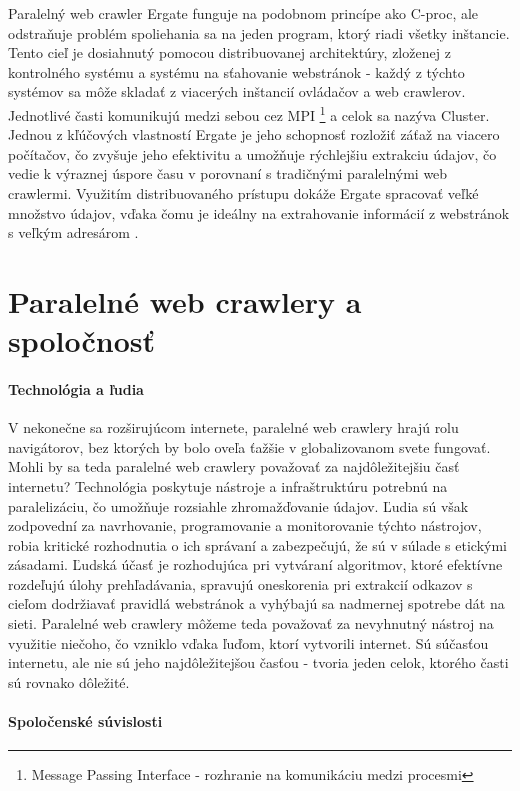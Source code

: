 \documentclass[10pt,twoside,slovak,a4paper]{article}
\begin{document}
Paralelný web crawler Ergate funguje na podobnom princípe ako C-proc, ale odstraňuje problém spoliehania sa na jeden program, ktorý riadi všetky inštancie. Tento cieľ je dosiahnutý pomocou distribuovanej architektúry, zloženej z kontrolného systému a systému na sťahovanie webstránok - každý z týchto systémov sa môže skladať z viacerých inštancií ovládačov a web crawlerov. Jednotlivé časti komunikujú medzi sebou cez MPI \footnote{Message Passing Interface - rozhranie na komunikáciu medzi procesmi} a celok sa nazýva Cluster. Jednou z kľúčových vlastností Ergate je jeho schopnosť rozložiť záťaž na viacero počítačov, čo zvyšuje jeho efektivitu a umožňuje rýchlejšiu extrakciu údajov, čo vedie k výraznej úspore času v porovnaní s tradičnými paralelnými web crawlermi. Využitím distribuovaného prístupu dokáže Ergate spracovať veľké množstvo údajov, vďaka čomu je ideálny na extrahovanie informácií z webstránok s veľkým adresárom \cite{5709184}.

\section{Paralelné web crawlery a spoločnosť}

\paragraph{Technológia a ľudia}

V nekonečne sa rozširujúcom internete, paralelné web crawlery hrajú rolu navigátorov, bez ktorých by bolo oveľa ťažšie v globalizovanom svete fungovať. Mohli by sa teda paralelné web crawlery považovať za najdôležitejšiu časť internetu? Technológia poskytuje nástroje a infraštruktúru potrebnú na paralelizáciu, čo umožňuje rozsiahle zhromažďovanie údajov. Ľudia sú však zodpovední za navrhovanie, programovanie a monitorovanie týchto nástrojov, robia kritické rozhodnutia o ich správaní a zabezpečujú, že sú v súlade s etickými zásadami. Ľudská účasť je rozhodujúca pri vytváraní algoritmov, ktoré efektívne rozdeľujú úlohy prehľadávania, spravujú oneskorenia pri extrakcií odkazov s cieľom dodržiavať pravidlá webstránok a vyhýbajú sa nadmernej spotrebe dát na sieti. Paralelné web crawlery môžeme teda považovať za nevyhnutný nástroj na využitie niečoho, čo vzniklo vďaka ľuďom, ktorí vytvorili internet. Sú súčasťou internetu, ale nie sú jeho najdôležitejšou časťou - tvoria jeden celok, ktorého časti sú rovnako dôležité.

\paragraph{Spoločenské súvislosti}
\end{document}
